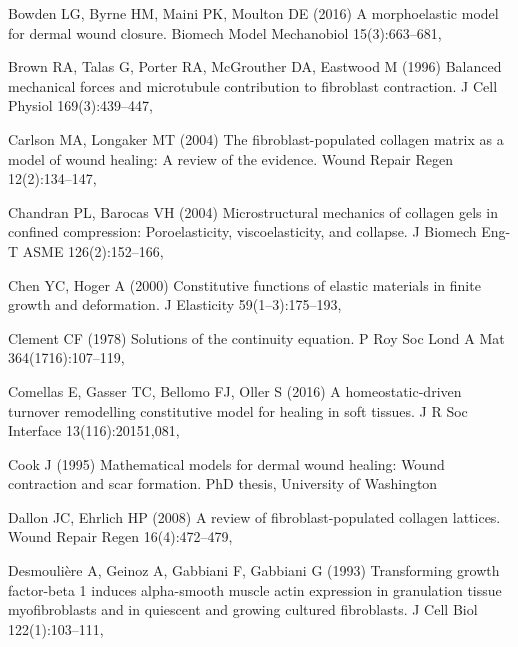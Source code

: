 \begin{thebibliography}{124}
Bowden LG, Byrne HM, Maini PK, Moulton DE (2016) A morphoelastic model for
  dermal wound closure. Biomech Model Mechanobiol 15(3):663--681,

Brown RA, Talas G, Porter RA, McGrouther DA, Eastwood M (1996) Balanced
  mechanical forces and microtubule contribution to fibroblast contraction. J
  Cell Physiol 169(3):439--447,

Carlson MA, Longaker MT (2004) The fibroblast-populated collagen matrix as a
  model of wound healing: A review of the evidence. Wound Repair Regen
  12(2):134--147, 

Chandran PL, Barocas VH (2004) Microstructural mechanics of collagen gels in
  confined compression: Poroelasticity, viscoelasticity, and collapse. J
  Biomech Eng- T ASME 126(2):152--166, 

Chen YC, Hoger A (2000) Constitutive functions of elastic materials in finite
  growth and deformation. J Elasticity 59(1--3):175--193,

Clement CF (1978) Solutions of the continuity equation. P Roy Soc Lond A Mat
  364(1716):107--119, 

Comellas E, Gasser TC, Bellomo FJ, Oller S (2016) A homeostatic-driven turnover
  remodelling constitutive model for healing in soft tissues. J R Soc Interface
  13(116):20151,081, 

Cook J (1995) Mathematical models for dermal wound healing: Wound contraction
  and scar formation. PhD thesis, University of Washington

Dallon JC, Ehrlich HP (2008) A review of fibroblast-populated collagen
  lattices. Wound Repair Regen 16(4):472--479,

Desmouli\`{e}re A, Geinoz A, Gabbiani F, Gabbiani G (1993) Transforming growth
  factor-beta 1 induces alpha-smooth muscle actin expression in granulation
  tissue myofibroblasts and in quiescent and growing cultured fibroblasts. J
  Cell Biol 122(1):103--111, 


\end{thebibliography}
